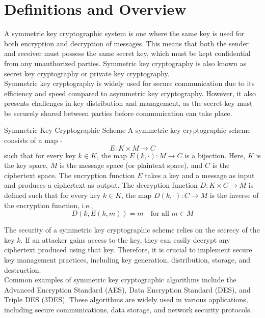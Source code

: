 \documentclass[openany]{book}
\begin{document}
\section{Definitions and Overview}
A symmetric key cryptographic system is one where the same key is used for both encryption and decryption of messages. This means that both the sender and receiver must possess the same secret key, which must be kept confidential from any unauthorized parties. Symmetric key cryptography is also known as secret key cryptography or private key cryptography. \\
Symmetric key cryptography is widely used for secure communication due to its efficiency and speed compared to asymmetric key cryptography. However, it also presents challenges in key distribution and management, as the secret key must be securely shared between parties before communication can take place. \\
\begin{mydefinition}{Symmetric Key Cryptographic Scheme}
    A symmetric key cryptographic scheme consists of a map - 
    $$E: K \times M \to C$$
    such that for every key \( k \in K \), the map \( E(k, \cdot): M \to C \) is a bijection. Here, \( K \) is the key space, \( M \) is the message space (or plaintext space), and \( C \) is the ciphertext space. The encryption function \( E \) takes a key and a message as input and produces a ciphertext as output. The decryption function \( D: K \times C \to M \) is defined such that for every key \( k \in K \), the map \( D(k, \cdot): C \to M \) is the inverse of the encryption function, i.e.,
    $$D(k, E(k, m)) = m \quad \text{for all } m \in M$$
\end{mydefinition}
\begin{mynote}
The security of a symmetric key cryptographic scheme relies on the secrecy of the key \( k \). If an attacker gains access to the key, they can easily decrypt any ciphertext produced using that key. Therefore, it is crucial to implement secure key management practices, including key generation, distribution, storage, and destruction. \\
Common examples of symmetric key cryptographic algorithms include the Advanced Encryption Standard (AES), Data Encryption Standard (DES), and Triple DES (3DES). These algorithms are widely used in various applications, including secure communications, data storage, and network security protocols.
\end{mynote}
\end{document}
